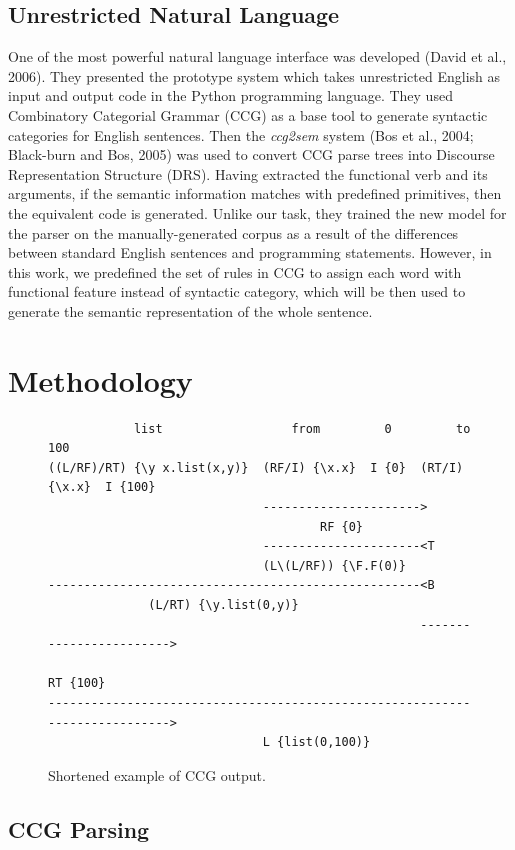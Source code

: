 \documentclass[11pt,letterpaper]{article}
\begin{document}
\subsection{Unrestricted Natural Language}
One of the most powerful natural language interface was developed (David et al., 2006). They presented the prototype system which takes unrestricted English as input and output code in the Python programming language. They used Combinatory Categorial Grammar (CCG) as a base tool to generate syntactic categories for English sentences. Then the \textit{ccg2sem} system (Bos et al., 2004; Black-burn and Bos, 2005) was used to convert CCG parse trees into Discourse Representation Structure (DRS). Having extracted the functional verb and its arguments, if the semantic information matches with predefined primitives, then the equivalent code is generated. Unlike our task, they trained the new model for the parser on the manually-generated corpus as a result of the differences between standard English sentences and programming statements. However, in this work, we predefined the set of rules in CCG to assign each word with functional feature instead of syntactic category, which will be then used to generate the semantic representation of the whole sentence.

\section{Methodology}

\begin{figure}[t]
  \small
  \begin{verbatim}
            list                  from         0         to          100
((L/RF)/RT) {\y x.list(x,y)}  (RF/I) {\x.x}  I {0}  (RT/I) {\x.x}  I {100}
                              ---------------------->
                                      RF {0}
                              ----------------------<T
                              (L\(L/RF)) {\F.F(0)}
----------------------------------------------------<B
              (L/RT) {\y.list(0,y)}
                                                    ------------------------>
                                                            RT {100}
---------------------------------------------------------------------------->
                              L {list(0,100)}
  \end{verbatim}
  \caption{\label{font-figure} Shortened example of CCG output.}
\end{figure}

\subsection{CCG Parsing}
\end{document}
